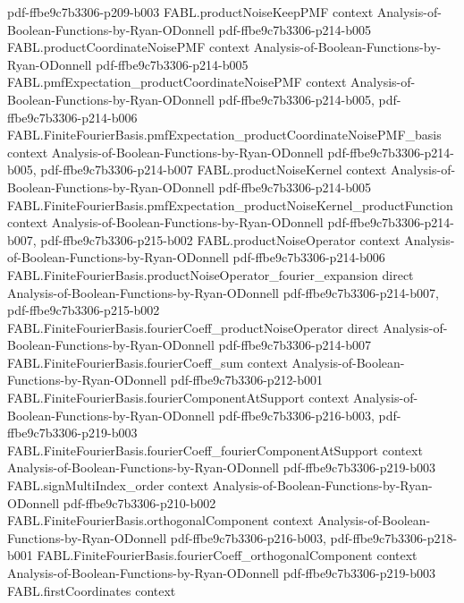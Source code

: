 \begin{theorem}
  {pdf-ffbe9c7b3306-p209-b003}
\proofstep
  {FABL.productNoiseKeepPMF}
  {context}
  {Analysis-of-Boolean-Functions-by-Ryan-ODonnell}
  {pdf-ffbe9c7b3306-p214-b005}
\proofstep
  {FABL.productCoordinateNoisePMF}
  {context}
  {Analysis-of-Boolean-Functions-by-Ryan-ODonnell}
  {pdf-ffbe9c7b3306-p214-b005}
\proofstep
  {FABL.pmfExpectation_productCoordinateNoisePMF}
  {context}
  {Analysis-of-Boolean-Functions-by-Ryan-ODonnell}
  {pdf-ffbe9c7b3306-p214-b005,
    pdf-ffbe9c7b3306-p214-b006}
\proofstep
  {FABL.FiniteFourierBasis.pmfExpectation_productCoordinateNoisePMF_basis}
  {context}
  {Analysis-of-Boolean-Functions-by-Ryan-ODonnell}
  {pdf-ffbe9c7b3306-p214-b005,
    pdf-ffbe9c7b3306-p214-b007}
\proofstep
  {FABL.productNoiseKernel}
  {context}
  {Analysis-of-Boolean-Functions-by-Ryan-ODonnell}
  {pdf-ffbe9c7b3306-p214-b005}
\proofstep
  {FABL.FiniteFourierBasis.pmfExpectation_productNoiseKernel_productFunction}
  {context}
  {Analysis-of-Boolean-Functions-by-Ryan-ODonnell}
  {pdf-ffbe9c7b3306-p214-b007,
    pdf-ffbe9c7b3306-p215-b002}
\proofstep
  {FABL.productNoiseOperator}
  {context}
  {Analysis-of-Boolean-Functions-by-Ryan-ODonnell}
  {pdf-ffbe9c7b3306-p214-b006}
\proofstep
  {FABL.FiniteFourierBasis.productNoiseOperator_fourier_expansion}
  {direct}
  {Analysis-of-Boolean-Functions-by-Ryan-ODonnell}
  {pdf-ffbe9c7b3306-p214-b007,
    pdf-ffbe9c7b3306-p215-b002}
\proofstep
  {FABL.FiniteFourierBasis.fourierCoeff_productNoiseOperator}
  {direct}
  {Analysis-of-Boolean-Functions-by-Ryan-ODonnell}
  {pdf-ffbe9c7b3306-p214-b007}
\proofstep
  {FABL.FiniteFourierBasis.fourierCoeff_sum}
  {context}
  {Analysis-of-Boolean-Functions-by-Ryan-ODonnell}
  {pdf-ffbe9c7b3306-p212-b001}
\proofstep
  {FABL.FiniteFourierBasis.fourierComponentAtSupport}
  {context}
  {Analysis-of-Boolean-Functions-by-Ryan-ODonnell}
  {pdf-ffbe9c7b3306-p216-b003,
    pdf-ffbe9c7b3306-p219-b003}
\proofstep
  {FABL.FiniteFourierBasis.fourierCoeff_fourierComponentAtSupport}
  {context}
  {Analysis-of-Boolean-Functions-by-Ryan-ODonnell}
  {pdf-ffbe9c7b3306-p219-b003}
\proofstep
  {FABL.signMultiIndex_order}
  {context}
  {Analysis-of-Boolean-Functions-by-Ryan-ODonnell}
  {pdf-ffbe9c7b3306-p210-b002}
\proofstep
  {FABL.FiniteFourierBasis.orthogonalComponent}
  {context}
  {Analysis-of-Boolean-Functions-by-Ryan-ODonnell}
  {pdf-ffbe9c7b3306-p216-b003,
    pdf-ffbe9c7b3306-p218-b001}
\proofstep
  {FABL.FiniteFourierBasis.fourierCoeff_orthogonalComponent}
  {context}
  {Analysis-of-Boolean-Functions-by-Ryan-ODonnell}
  {pdf-ffbe9c7b3306-p219-b003}
\proofstep
  {FABL.firstCoordinates}
  {context}

\end{theorem}
